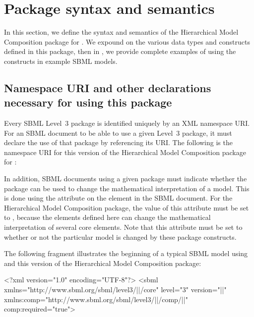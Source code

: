 
\newcommand{\fixttspace}{\hspace*{1pt}}

\section{Package syntax and semantics}
\label{sec:syntax}

In this section, we define the syntax and semantics of the Hierarchical Model Composition package for \sbmlthreecore.  We expound on the various data types and constructs defined in this package, then in , we provide complete examples of using the constructs in example SBML models.

\subsection{Namespace URI and other declarations necessary for using this package}
\label{xml-namespace}

Every SBML Level~3 package is identified uniquely by an XML namespace URI.  For an SBML document to be able to use a given Level~3 package, it must declare the use of that package by referencing its URI. The following is the namespace URI for this version of the Hierarchical Model Composition package for \sbmlthreecore:
\begin{center}
\end{center}

In addition, SBML documents using a given package must indicate whether the package can be used to change the mathematical interpretation of a model.  This is done using the attribute  on the  element in the SBML document.  For the Hierarchical Model Composition package, the value of this attribute must be set to , because the elements defined here can change the mathematical interpretation of several core elements.  Note that this attribute must be set to  whether or not the particular model is changed by these package constructs.

The following fragment illustrates the beginning of a typical SBML model using \sbmlthreecore and this version of the Hierarchical Model Composition package:

\begin{example}
<?xml version="1.0" encoding="UTF-8"?>
<sbml xmlns="http://www.sbml.org/sbml/level3/||/core" level="3" version="||"
      xmlns:comp="http://www.sbml.org/sbml/level3/||/comp/||" comp:required="true">
\end{example}
   

